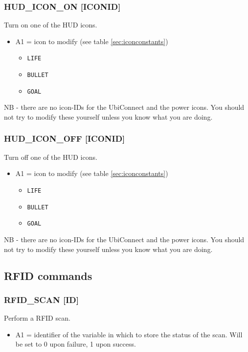 \documentclass[12pt,a4paper]{scrbook}
\begin{document}
\subsubsection{HUD\_ICON\_ON [ICONID]}
Turn on one of the HUD icons.
\begin{itemize}
\item A1 = icon to modify (see table \ref{sec:iconconstants})
\begin{itemize}
\item \texttt{LIFE}
\item \texttt{BULLET}
\item \texttt{GOAL}
\end{itemize}
\end{itemize}
NB - there are no icon-IDs for the UbiConnect and the power icons.  You should not try to 
modify these yourself unless you know what you are doing.

\subsubsection{HUD\_ICON\_OFF [ICONID]}
Turn off one of the HUD icons.
\begin{itemize}
\item A1 = icon to modify (see table \ref{sec:iconconstants})
\begin{itemize}
\item \texttt{LIFE}
\item \texttt{BULLET}
\item \texttt{GOAL}
\end{itemize}
\end{itemize}
NB - there are no icon-IDs for the UbiConnect and the power icons.  You should not try to 
modify these yourself unless you know what you are doing.

\subsection{RFID commands}

\subsubsection{RFID\_SCAN [ID]}
Perform a RFID scan.
\begin{itemize}
\item A1 = identifier of the variable in which to store the status of the scan.  Will be set to 0 
		upon failure, 1 upon success.
\end{itemize}
\end{document}
